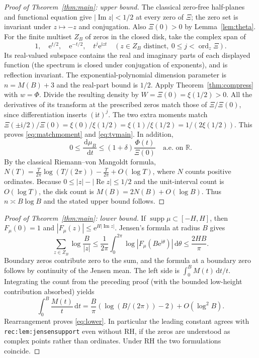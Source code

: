 \documentclass[11pt]{article}
\theoremstyle{remark}\newtheorem{remark}[theorem]{Remark}
\newcommand{\R}{\mathbb R}\newcommand{\C}{\mathbb C}\newcommand{\e}{\mathrm e}\newcommand{\ii}{\mathrm i}\newcommand{\dd}{\,\mathrm d}\newcommand{\abs}[1]{\left|#1\right|}\newcommand{\norm}[1]{\left\|#1\right\|}\newcommand{\ord}{\operatorname{ord}}\newcommand{\re}{\operatorname{Re}}\newcommand{\im}{\operatorname{Im}}\newcommand{\supp}{\operatorname{supp}}
\begin{document}
\begin{proof}[Proof of Theorem~\ref{thm:main}: upper bound]
The classical zero-free half-planes and functional equation give $|\im z|<1/2$ at every zero of $\Xi$; the zero set is invariant under $z\mapsto-z$ and conjugation. Also $\Xi(0)>0$ by Lemma~\ref{lem:theta}. For the finite multiset $Z_B$ of zeros in the closed disk, take the complex span of
\[
1,\quad \e^{t/2},\quad\e^{-t/2},\quad t^j\e^{\ii zt}\quad(z\in Z_B\text{ distinct},\ 0\le j<\ord_z\Xi).
\]
Its real-valued subspace contains the real and imaginary parts of each displayed function (the spectrum is closed under conjugation of exponents), and is reflection invariant. The exponential-polynomial dimension parameter is $n=M(B)+3$ and the real-part bound is $1/2$. Apply Theorem~\ref{thm:compress} with $w=\Phi$. Divide the resulting density by $W=\Xi(0)=\xi(1/2)>0$. All the derivatives of its transform at the prescribed zeros match those of $\Xi/\Xi(0)$, since differentiation inserts $(\ii t)^j$. The two extra moments match $\Xi(\pm\ii/2)/\Xi(0)=\xi(0)/\xi(1/2)=\xi(1)/\xi(1/2)=1/(2\xi(1/2))$. This proves \eqref{eq:matchmoment} and \eqref{eq:tvmain}. In addition,
\begin{equation}\label{eq:domdensity}
0\le \frac{\dd\mu_B}{\dd t}\le(1+\delta)\frac{\Phi(t)}{\Xi(0)}\quad\text{a.e. on }\R.
\end{equation}
By the classical Riemann--von Mangoldt formula, $N(T)=\tfrac{T}{2\pi}\log(T/(2\pi))-\tfrac{T}{2\pi}+O(\log T)$, where $N$ counts positive ordinates. Because $0\le |z|-|\re z|\le1/2$ and the unit-interval count is $O(\log T)$, the disk count is $M(B)=2N(B)+O(\log B)$. Thus $n\asymp B\log B$ and the stated upper bound follows.
\end{proof}

\begin{proof}[Proof of Theorem~\ref{thm:main}: lower bound]
If $\supp\mu\subset[-H,H]$, then $F_\mu(0)=1$ and $|F_\mu(z)|\le\e^{H|\im z|}$. Jensen's formula at radius $B$ gives
\[
\sum_{z\in Z_B}\log\frac{B}{|z|}\le\frac1{2\pi}\int_0^{2\pi}\log|F_\mu(B\e^{\ii\theta})|\dd\theta\le \frac{2HB}{\pi}.
\]
Boundary zeros contribute zero to the sum, and the formula at a boundary zero follows by continuity of the Jensen mean. The left side is $\int_0^B M(t)\dd t/t$. Integrating the count from the preceding proof (with the bounded low-height contribution absorbed) yields
\[
\int_0^B\frac{M(t)}t\dd t
=\frac B\pi(\log(B/(2\pi))-2)+O(\log^2 B).
\]
Rearrangement proves \eqref{eq:lower}. In particular the leading constant agrees with \texttt{rec:lem:jensensupport} even without RH, if the zeros are understood as complex points rather than ordinates. Under RH the two formulations coincide.
\end{proof}
\end{document}
